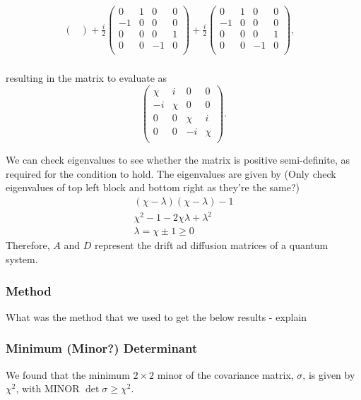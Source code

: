 \documentclass[11pt,a4paper]{article}
\numberwithin{equation}{section}
\begin{document}
\begin{align*}
\begin{pmatrix}
	\end{pmatrix} + \frac{i}{2}\begin{pmatrix}
	0 & 1 & 0 & 0 \\
	-1 & 0 & 0 & 0\\
	0 & 0 & 0 & 1\\
	0 & 0 & -1 & 0\\
	\end{pmatrix}  + \frac{i}{2}\begin{pmatrix}
	0 & 1 & 0 & 0 \\
	-1 & 0 & 0 & 0\\
	0 & 0 & 0 & 1\\
	0 & 0 & -1 & 0\\
	\end{pmatrix},&\\
	\end{align*}
	
	resulting in the matrix to evaluate as
	\begin{equation*}
	\begin{pmatrix}
	\chi & i & 0 & 0 \\
	-i & \chi & 0 & 0\\
	0 & 0 & \chi & i\\
	0 & 0 & -i & \chi\\
	\end{pmatrix}.
	\end{equation*}
	
	We can check eigenvalues to see whether the matrix is positive semi-definite, as required for the condition to hold. The eigenvalues are given by \color{red}(Only check eigenvalues of top left block and bottom right as they're the same?) \color{black} 
	\begin{align*}
	&(\chi- \lambda)(\chi- \lambda) - 1&\\
	&\chi^2 - 1 - 2\chi \lambda + \lambda^2&\\
	&\lambda = \chi \pm 1 \geq 0& \tag*{as $\chi \geq 1$.}
	\end{align*}
	Therefore, $A$ and $D$ represent the drift ad diffusion matrices of a quantum system. 
	
	\color{red}\subsubsection{Method}\color{black}
	What was the method that we used to get the below results - explain
	
	\subsubsection{Minimum (Minor?) Determinant}
	We found that the minimum $2 \times 2$ minor of the covariance matrix, $\sigma$, is given by $\chi^{2}$, with MINOR $\det \sigma \geq \chi^{2}$.
	
\end{document}

